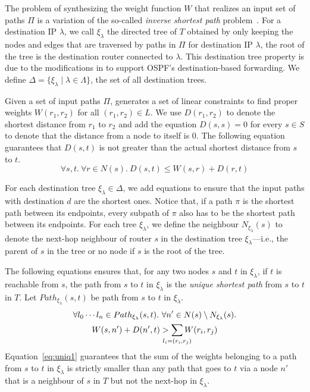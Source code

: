 The problem of synthesizing the weight function $W$ that
realizes an input set of paths $\Pi$ is
a
variation of the so-called {\em inverse shortest path} 
problem~\cite{isp}. 
For a destination IP $\lambda$, we call $\xi_\lambda$ 
the directed tree of $T$ 
obtained by only keeping the nodes and edges 
that are traversed by paths in $\Pi$ for 
destination IP $\lambda$, the root of the tree
is the destination router connected to $\lambda$. 
 This destination tree
 property is due to the modifications in \genesis
 to support OSPF's destination-based forwarding. We
 define $\Delta=\{\xi_\lambda\mid \lambda \in \Lambda\}$,   
the set of all destination trees. 

Given a set of input paths $\Pi$, \name 
generates a set of linear constraints to 
find proper weights $W(r_1, r_2)$ 
for all $(r_1, r_2) \in L$.
We use 
$D(r_1, r_2)$ to denote the 
shortest distance from $r_1$ to $r_2$ and
add the equation $D(s,s) = 0$ 
for every $s\in S$ to denote that the distance
from a node to itself is $0$.
The
following equation guarantees that $D(s,t)$ is not greater than 
the actual shortest distance from $s$ to $t$.
\begin{equation} \label{eq:dist}
\forall s, t. ~\forall r \in N(s).~
D(s, t) \leq W(s, r) + D(r, t)
\end{equation}

For each destination tree $\xi_\lambda\in\Delta$, we add equations to ensure 
that the input paths with destination $d$ are the shortest ones.
Notice that, if a path $\pi$
is the shortest path between its endpoints, every 
subpath of $\pi$ also has to be the shortest path between its endpoints.
For each tree $\xi_\lambda$, we define the neighbour
 $N_{\xi_\lambda}(s)$ to denote the 
next-hop neighbour of router $s$ in the destination tree $\xi_\lambda$---i.e., the parent
of $s$ in the tree or no node if $s$ is the root of the tree.

The following equations ensures that, for any 
 two nodes $s$ and $t$ in
$\xi_\lambda$, if $t$ is reachable from $s$, 
the path from $s$ to $t$ in $\xi_\lambda$ is the 
\emph{unique shortest path} from $s$ to $t$ in $T$.
Let $Path_{\xi_\lambda}(s,t)$ be path from $s$ to $t$ in $\xi_\lambda$.
\begin{multline} \label{eq:uniq1}
\forall l_0\cdots l_n\in Path_{\xi_\lambda}(s,t).
~\forall n' \in N(s) \setminus N_{\xi_\lambda}(s). \\
W(s, n') + D(n', t) > \sum_{\mathclap{\substack{l_i=(r_i,r_j)}}} 
W(r_i, r_j) 
\end{multline}
Equation~\ref{eq:uniq1} guarantees that 
the sum of the weights belonging to a path from $s$ to $t$ in $\xi_\lambda$ 
is strictly smaller than 
any path that goes to $t$ via 
a node $n'$ that is a neighbour of $s$ in $T$ but not 
the next-hop in $\xi_\lambda$.

